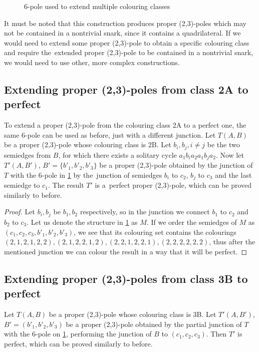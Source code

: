 \begin{figure}[h]
	\centering
	
	\caption{6-pole used to extend multiple colouring classes}
	\label{fig:multiple}
\end{figure}

It must be noted that this construction produces proper (2,3)-poles which may not be contained in a nontrivial snark, since it contains a quadrilateral. If we would need to extend some proper (2,3)-pole to obtain a specific colouring class and require the~extended proper (2,3)-pole to be contained in a nontrivial snark, we would need to use other, more complex constructions.

\subsection{Extending proper (2,3)-poles from class 2A to perfect}

To extend a proper (2,3)-pole from the colouring class 2A to a perfect one, the same 6-pole can be used as before, just with a different junction. Let $T(A,B)$ be a proper (2,3)-pole whose colouring class is 2B. Let $b_i,b_j,i\neq j$ be the two semiedges from $B$, for which there exists a solitary cycle $a_1b_ia_2a_1b_ja_2$. Now let $T'(A,B')$, $B'=\{b'_1, b'_2, b'_3\}$ be a proper (2,3)-pole obtained by the junction of $T$ with the 6-pole in \cref{fig:multiple} by the~junction of semiedges $b_i$ to $c_2$, $b_j$ to $c_3$ and the last semiedge to $c_1$. The result $T'$ is a~perfect proper (2,3)-pole, which can be proved similarly to before.

\begin{proof}
	Let $b_i,b_j$ be $b_1,b_2$ respectively, so in the junction we connect $b_1$ to $c_2$ and $b_2$ to $c_3$. Let us denote the structure in  \cref{fig:multiple} as $M$. If we order the semiedges of $M$ as $(c_1,c_2,c_3,b'_1,b'_2,b'_3)$, we see that its colouring set contains the colourings $(2,1,2,1,2,2), (2,1,2,2,1,2), (2,2,1,2,2,1), (2,2,2,2,2,2)$, thus after the mentioned junction we can colour the result in a way that it will be perfect.
\end{proof}

\subsection{Extending proper (2,3)-poles from class 3B to perfect}

Let $T(A,B)$ be a proper (2,3)-pole whose colouring class is 3B. Let $T'(A,B')$, \linebreak ${B'=(b'_1, b'_2, b'_3)}$ be a proper (2,3)-pole obtained by the partial junction of $T$ with the 6-pole on \cref{fig:multiple}, performing the junction of $B$ to $(c_1,c_2,c_3)$. Then $T'$ is perfect, which can be proved similarly to before.


